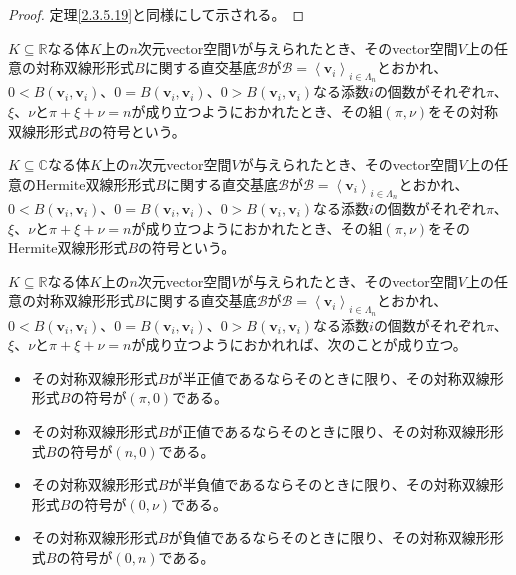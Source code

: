 \documentclass[dvipdfmx]{jsarticle}
\begin{document}
\begin{proof} 定理\ref{2.3.5.19}と同様にして示される。
\end{proof}
\begin{dfn}
$K \subseteq \mathbb{R}$なる体$K$上の$n$次元vector空間$V$が与えられたとき、そのvector空間$V$上の任意の対称双線形形式$B$に関する直交基底$\mathcal{B}$が$\mathcal{B} =\left\langle \mathbf{v}_{i} \right\rangle_{i \in \varLambda_{n}}$とおかれ、$0 < B\left( \mathbf{v}_{i},\mathbf{v}_{i} \right)$、$0 = B\left( \mathbf{v}_{i},\mathbf{v}_{i} \right)$、$0 > B\left( \mathbf{v}_{i},\mathbf{v}_{i} \right)$なる添数$i$の個数がそれぞれ$\pi$、$\xi$、$\nu$と$\pi + \xi + \nu = n$が成り立つようにおかれたとき、その組$(\pi,\nu)$をその対称双線形形式$B$の符号という。
\end{dfn}
\begin{dfn}
$K \subseteq \mathbb{C}$なる体$K$上の$n$次元vector空間$V$が与えられたとき、そのvector空間$V$上の任意のHermite双線形形式$B$に関する直交基底$\mathcal{B}$が$\mathcal{B} =\left\langle \mathbf{v}_{i} \right\rangle_{i \in \varLambda_{n}}$とおかれ、$0 < B\left( \mathbf{v}_{i},\mathbf{v}_{i} \right)$、$0 = B\left( \mathbf{v}_{i},\mathbf{v}_{i} \right)$、$0 > B\left( \mathbf{v}_{i},\mathbf{v}_{i} \right)$なる添数$i$の個数がそれぞれ$\pi$、$\xi$、$\nu$と$\pi + \xi + \nu = n$が成り立つようにおかれたとき、その組$(\pi,\nu)$をそのHermite双線形形式$B$の符号という。
\end{dfn}
\begin{thm}\label{2.3.5.21}
$K \subseteq \mathbb{R}$なる体$K$上の$n$次元vector空間$V$が与えられたとき、そのvector空間$V$上の任意の対称双線形形式$B$に関する直交基底$\mathcal{B}$が$\mathcal{B} =\left\langle \mathbf{v}_{i} \right\rangle_{i \in \varLambda_{n}}$とおかれ、$0 < B\left( \mathbf{v}_{i},\mathbf{v}_{i} \right)$、$0 = B\left( \mathbf{v}_{i},\mathbf{v}_{i} \right)$、$0 > B\left( \mathbf{v}_{i},\mathbf{v}_{i} \right)$なる添数$i$の個数がそれぞれ$\pi$、$\xi$、$\nu$と$\pi + \xi + \nu = n$が成り立つようにおかれれば、次のことが成り立つ。
\begin{itemize}
\item
  その対称双線形形式$B$が半正値であるならそのときに限り、その対称双線形形式$B$の符号が$(\pi,0)$である。
\item
  その対称双線形形式$B$が正値であるならそのときに限り、その対称双線形形式$B$の符号が$(n,0)$である。
\item
  その対称双線形形式$B$が半負値であるならそのときに限り、その対称双線形形式$B$の符号が$(0,\nu)$である。
\item
  その対称双線形形式$B$が負値であるならそのときに限り、その対称双線形形式$B$の符号が$(0,n)$である。
\end{itemize}
\end{thm}
\end{document}
